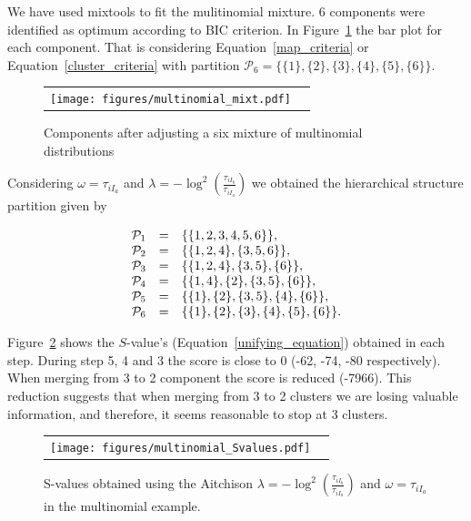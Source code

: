 \documentclass[10pt, a4paper]{article}
\newcommand{\pkg}[1]{{\fontseries{b}\selectfont #1}}
\begin{document}
\begin{spacing}{1.9}
We have used \pkg{mixtools} \citep{benaglia2009mixtools} to fit the mulitinomial mixture. 6 components were identified as optimum according to BIC criterion. In Figure~\ref{multinomial_mixture} the bar plot for each component. That is considering Equation~\ref{map_criteria} or Equation~\ref{cluster_criteria} with partition $\mathcal{P}_6 = \{\{1\}, \{2\}, \{3\}, \{4\}, \{5\}, \{6\}\}$.

\begin{figure}[t]
\begin{center}
\begin{tabular}{cc}
  \texttt{[image: figures/multinomial\_mixt.pdf]} \\
 \end{tabular}
 \caption{Components after adjusting a six mixture of multinomial distributions}\label{multinomial_mixture}
\end{center}
\end{figure}

Considering $\omega = \tau_{i I_a}$ and $\lambda = -\log^2 \left(\frac{ \tau_{iI_b} }{ \tau_{iI_a} }\right)$ we obtained the hierarchical structure partition given by


\begin{equation}
\begin{array}{r c l}
\mathcal{P}_1 &=& \{\{1,2,3,4,5,6\}\}, \\ 
\mathcal{P}_2 &=& \{\{1,2,4\},\{3,5,6\}\}, \\ 
\mathcal{P}_3 &=& \{\{1,2,4\},\{3,5\},\{6\}\}, \\ 
\mathcal{P}_4 &=& \{\{1,4\},\{2\},\{3,5\},\{6\}\}, \\ 
\mathcal{P}_5 &=& \{\{1\},\{2\},\{3,5\},\{4\},\{6\}\}, \\ 
\mathcal{P}_6 &=& \{\{1\},\{2\},\{3\},\{4\},\{5\},\{6\} \}.
\end{array}
\label{hier_ex_multinomial}
\end{equation}

Figure~\ref{multinomial_Svalues} shows the $S$-value's (Equation~\ref{unifying_equation}) obtained in each step. During step 5, 4 and 3 the score is close to 0 (-62, -74, -80 respectively). When merging from 3 to 2 component the score is reduced (-7966). This reduction suggests that when merging from 3 to 2 clusters we are losing valuable information, and therefore, it seems reasonable to stop at 3 clusters.

\begin{figure}[t]
\begin{center}
\begin{tabular}{cc}
  \texttt{[image: figures/multinomial\_Svalues.pdf]} \\
 \end{tabular}
 \caption{S-values obtained using the Aitchison $\lambda = -\log^2 \left(\frac{ \tau_{iI_b} }{ \tau_{iI_a} }\right)$ and $\omega = \tau_{i I_a}$ in the multinomial example.}\label{multinomial_Svalues}
\end{center}
\end{figure}


\end{spacing}
\end{document}
